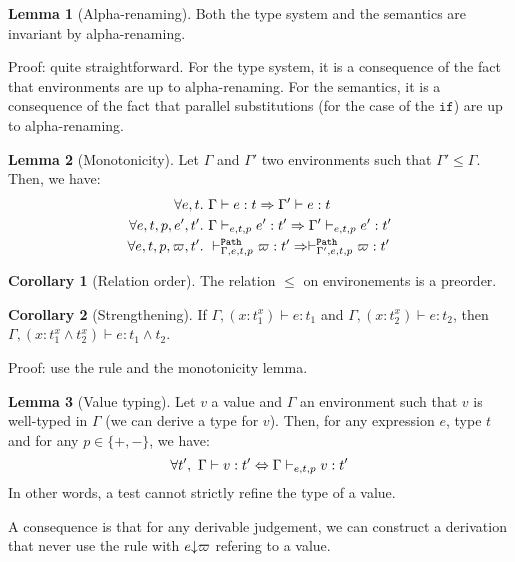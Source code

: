 \documentclass[a4paper]{article}
\theoremstyle{definition}
\newtheorem{lemma}{Lemma}
\newtheorem{corollary}{Corollary}
\begin{document}
        \begin{lemma}[Alpha-renaming]
          Both the type system and the semantics are invariant by alpha-renaming.
        \end{lemma}
        Proof: quite straightforward.
        For the type system, it is a consequence of the fact that environments are up to alpha-renaming.
        For the semantics, it is a consequence of the fact that parallel substitutions (for the case of the $\texttt{if}$)
        are up to alpha-renaming.
    
        \begin{lemma}[Monotonicity]
          Let $\Gamma$ and $\Gamma'$ two environments such that $\Gamma' \leq \Gamma$.
          Then, we have:
          \begin{align*}
            \forall e,t.\ &\Gamma \vdash e:t \Rightarrow \Gamma' \vdash e:t\\
            \forall e,t,p,e',t'.\ &\Gamma \cvdash p e t e':t' \Rightarrow \Gamma' \cvdash p e t e':t'\\
            \forall e,t,p,\varpi,t'.\ &\pvdash \Gamma p e t \varpi:t' \Rightarrow \pvdash {\Gamma'} p e t \varpi:t'
          \end{align*}
        \end{lemma}

        \begin{corollary}[Relation order]
          The relation $\leq$ on environements is a preorder.
        \end{corollary}
    
        \begin{corollary}[Strengthening]
          If $\Gamma, (x:t_1^x) \vdash e:t_1$ and $\Gamma, (x:t_2^x) \vdash e:t_2$, then
          $\Gamma, (x:t_1^x \land t_2^x) \vdash e:t_1\land t_2$.
        \end{corollary}
        Proof: use the  rule and the monotonicity lemma.

        \begin{lemma}[Value typing]
          Let $v$ a value and $\Gamma$ an environment such that $v$ is well-typed in $\Gamma$ (we can derive a type for $v$).
          Then, for any expression $e$, type $t$ and for any $p\in\{+,-\}$, we have:
          \[\forall t',\ \Gamma \vdash v:t' \Leftrightarrow \Gamma \cvdash p e t v:t'\]
          In other words, a test cannot strictly refine the type of a value.

          A consequence is that for any derivable judgement, we can construct a derivation that
          never use the rule  with $\occ e \varpi$ refering to a value.
        \end{lemma}
\end{document}
